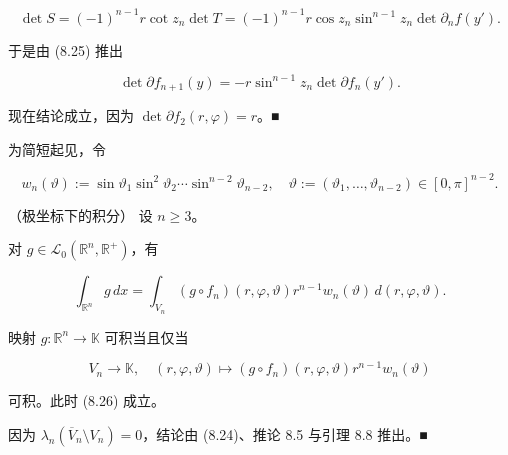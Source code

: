 \begin{lemma}
\[
\det S = (-1)^{n-1}r\cot z_{n}\det T = (-1)^{n-1}r\cos z_{n}\sin^{n-1}z_{n}\det \partial_{n}f(y').
\]

于是由 (8.25) 推出

\[
\det \partial f_{n+1}(y) = -r\sin^{n-1}z_{n}\det \partial f_{n}(y').
\]

现在结论成立，因为 $ \det \partial f_{2}(r, \varphi) = r $。\nobreak\hspace{0.35em}■

\end{lemma}

为简短起见，令

\[
w_{n}(\vartheta) := \sin\vartheta_{1}\sin^{2}\vartheta_{2}\cdots\sin^{n-2}\vartheta_{n-2}, \quad \vartheta := (\vartheta_{1}, \ldots, \vartheta_{n-2}) \in [0, \pi]^{n-2}.
\]

\begin{proposition}

（极坐标下的积分） 设 $ n \ge 3 $。

\begin{subitems}
\item

对 $ g \in \mathcal{L}_{0}(\mathbb{R}^{n}, \mathbb{R}^{+}) $，有

\begin{equation}
\int_{\mathbb{R}^{n}} g\,dx = \int_{V_{n}} (g\circ f_{n})(r, \varphi, \vartheta)r^{n-1}w_{n}(\vartheta)\, d(r, \varphi, \vartheta).\tag{8.26}
\end{equation}
\item

映射 $ g: \mathbb{R}^{n} \to \mathbb{K} $ 可积当且仅当

\[
V_{n} \to \mathbb{K}, \quad (r, \varphi, \vartheta) \mapsto (g\circ f_{n})(r, \varphi, \vartheta)r^{n-1}w_{n}(\vartheta)
\]

可积。此时 (8.26) 成立。

\proofhead
因为 $ \lambda_{n}(\overline{V}_{n}\setminus V_{n}) = 0 $，结论由 (8.24)、推论 8.5 与引理 8.8 推出。\nobreak\hspace{0.35em}■
\end{subitems}

\end{proposition}

